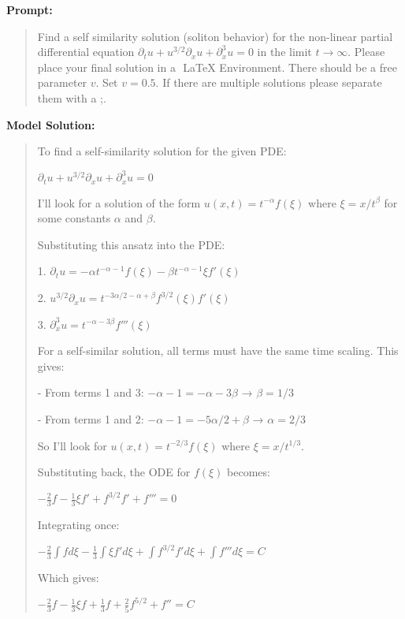 \documentclass{article}
\begin{document}
\textbf{Prompt:}
\begin{quote}
Find a self similarity solution (soliton behavior) for the non-linear partial differential equation $ \partial_t u + u^{3/2} \partial_x u + \partial_x^3 u = 0 $ in the limit $t\to\infty$. Please place your final solution in a $\boxed{}$ LaTeX Environment. There should be a free parameter $v$. Set $v=0.5$. If there are multiple solutions please separate them with a ;.
\end{quote}
\textbf{Model Solution:}
\begin{quote}
To find a self-similarity solution for the given PDE:

$\partial_t u + u^{3/2} \partial_x u + \partial_x^3 u = 0$



I'll look for a solution of the form $u(x,t) = t^{-\alpha} f(\xi)$ where $\xi = x/t^{\beta}$ for some constants $\alpha$ and $\beta$.



Substituting this ansatz into the PDE:

1. $\partial_t u = -\alpha t^{-\alpha-1}f(\xi) - \beta t^{-\alpha-1}\xi f'(\xi)$

2. $u^{3/2}\partial_x u = t^{-3\alpha/2-\alpha+\beta}f^{3/2}(\xi)f'(\xi)$

3. $\partial_x^3 u = t^{-\alpha-3\beta}f'''(\xi)$



For a self-similar solution, all terms must have the same time scaling. This gives:

- From terms 1 and 3: $-\alpha-1 = -\alpha-3\beta$ → $\beta = 1/3$

- From terms 1 and 2: $-\alpha-1 = -5\alpha/2+\beta$ → $\alpha = 2/3$



So I'll look for $u(x,t) = t^{-2/3}f(\xi)$ where $\xi = x/t^{1/3}$.



Substituting back, the ODE for $f(\xi)$ becomes:

$-\frac{2}{3}f - \frac{1}{3}\xi f' + f^{3/2}f' + f''' = 0$



Integrating once:

$-\frac{2}{3}\int f d\xi - \frac{1}{3}\int \xi f' d\xi + \int f^{3/2}f' d\xi + \int f''' d\xi = C$



Which gives:

$-\frac{2}{3}f - \frac{1}{3}\xi f + \frac{1}{3}f + \frac{2}{5}f^{5/2} + f'' = C$




\end{quote}
\end{document}
